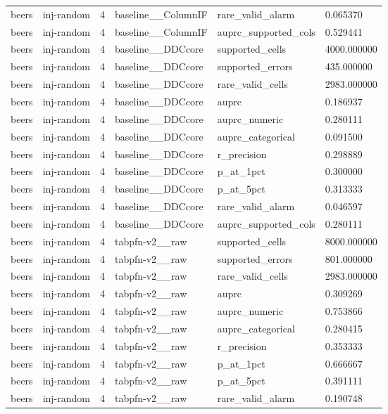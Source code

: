 \begin{tabular}{llllll}
beers & inj-random & 4 & baseline\_\_ColumnIF & rare\_valid\_alarm & 0.065370 \\
beers & inj-random & 4 & baseline\_\_ColumnIF & auprc\_supported\_cols & 0.529441 \\
beers & inj-random & 4 & baseline\_\_DDCcore & supported\_cells & 4000.000000 \\
beers & inj-random & 4 & baseline\_\_DDCcore & supported\_errors & 435.000000 \\
beers & inj-random & 4 & baseline\_\_DDCcore & rare\_valid\_cells & 2983.000000 \\
beers & inj-random & 4 & baseline\_\_DDCcore & auprc & 0.186937 \\
beers & inj-random & 4 & baseline\_\_DDCcore & auprc\_numeric & 0.280111 \\
beers & inj-random & 4 & baseline\_\_DDCcore & auprc\_categorical & 0.091500 \\
beers & inj-random & 4 & baseline\_\_DDCcore & r\_precision & 0.298889 \\
beers & inj-random & 4 & baseline\_\_DDCcore & p\_at\_1pct & 0.300000 \\
beers & inj-random & 4 & baseline\_\_DDCcore & p\_at\_5pct & 0.313333 \\
beers & inj-random & 4 & baseline\_\_DDCcore & rare\_valid\_alarm & 0.046597 \\
beers & inj-random & 4 & baseline\_\_DDCcore & auprc\_supported\_cols & 0.280111 \\
beers & inj-random & 4 & tabpfn-v2\_\_raw & supported\_cells & 8000.000000 \\
beers & inj-random & 4 & tabpfn-v2\_\_raw & supported\_errors & 801.000000 \\
beers & inj-random & 4 & tabpfn-v2\_\_raw & rare\_valid\_cells & 2983.000000 \\
beers & inj-random & 4 & tabpfn-v2\_\_raw & auprc & 0.309269 \\
beers & inj-random & 4 & tabpfn-v2\_\_raw & auprc\_numeric & 0.753866 \\
beers & inj-random & 4 & tabpfn-v2\_\_raw & auprc\_categorical & 0.280415 \\
beers & inj-random & 4 & tabpfn-v2\_\_raw & r\_precision & 0.353333 \\
beers & inj-random & 4 & tabpfn-v2\_\_raw & p\_at\_1pct & 0.666667 \\
beers & inj-random & 4 & tabpfn-v2\_\_raw & p\_at\_5pct & 0.391111 \\
beers & inj-random & 4 & tabpfn-v2\_\_raw & rare\_valid\_alarm & 0.190748 \\

\end{tabular}
